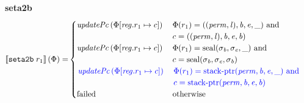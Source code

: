 \documentclass[a4paper]{article}
\begin{document}
\noindent\textbf{seta2b}\\
\begin{align*}
  \sem{\tsetatob{r_1}}(\Phi) = & 
                                \begin{cases}
                                  \updPcAddr{}\left(
                                    \Phi \updReg{r_1}{c}
                                    \right)
&
                                    \arraycolsep=0pt
                                    \begin{array}[t]{l}
                                      \Phi(r_1) = ((\perm,\lin),\baddr,\eaddr,\_) \tand \\
                                      c = ((\perm,\lin),\baddr,\eaddr,\baddr)
                                    \end{array} \\
                                  \updPcAddr{}\left(
                                    \Phi \updReg{r_1}{c}
                                    \right)
&
                                    \arraycolsep=0pt
                                    \begin{array}[t]{l}
                                      \Phi(r_1) = \seal{\sigma_\baddr,\sigma_\eaddr,\_} \tand \\
                                      c = \seal{\sigma_\baddr,\sigma_\eaddr,\sigma_\baddr}
                                    \end{array} \\
\sourcecolor\left.
                                  \updPcAddr{}\left(
                                    \Phi\updReg{r_1}{c}
                                    \right)
\right.
&
\sourcecolor\left.
                                    \arraycolsep=0pt
                                    \begin{array}[t]{l}
                                      \Phi(r_1) = \stkptr{\perm,\baddr,\eaddr,\_} \tand \\
                                      c = \stkptr{\perm,\baddr,\eaddr,\baddr}
                                    \end{array}\right. \\
                                    \failed & \totherwise
                                \end{cases}
\end{align*}
\end{document}
